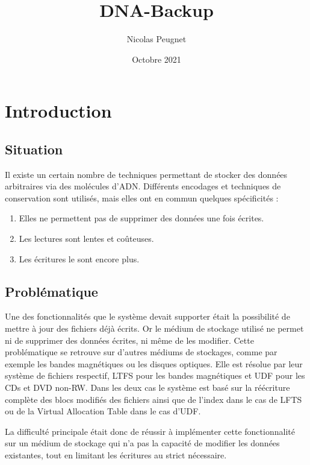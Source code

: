 \documentclass[a4paper,twocolumn]{article}
\title{DNA-Backup}
\date{Octobre 2021}
\author{Nicolas Peugnet}
\begin{document}
\maketitle

\tableofcontents

\section{Introduction}

\subsection{Situation}

Il existe un certain nombre de techniques permettant de stocker des données arbitraires via des molécules d'ADN.
Différents encodages et techniques de conservation sont utilisés, mais elles ont en commun quelques spécificités :

\begin{enumerate}
  \item Elles ne permettent pas de supprimer des données une fois écrites.
  \item Les lectures sont lentes et coûteuses.
  \item Les écritures le sont encore plus.
\end{enumerate}

\subsection{Problématique}

Une des fonctionnalités que le système devait supporter était la possibilité de mettre à jour des fichiers déjà écrits.
Or le médium de stockage utilisé ne permet ni de supprimer des données écrites, ni même de les modifier.
Cette problématique se retrouve sur d'autres médiums de stockages, comme par exemple les bandes magnétiques ou les disques optiques.
Elle est résolue par leur système de fichiers respectif, LTFS \cite{pease2010linear} pour les bandes magnétiques et UDF \cite{optical2003universal} pour les CDs et DVD non-RW.
Dans les deux cas le système est basé sur la réécriture complète des blocs modifiés des fichiers ainsi que de l'index dans le cas de LFTS ou de la Virtual Allocation Table dans le cas d'UDF.


La difficulté principale était donc de réussir à implémenter cette fonctionnalité sur un médium de stockage qui n'a pas la capacité de modifier les données existantes, tout en limitant les écritures au strict nécessaire.
\end{document}
